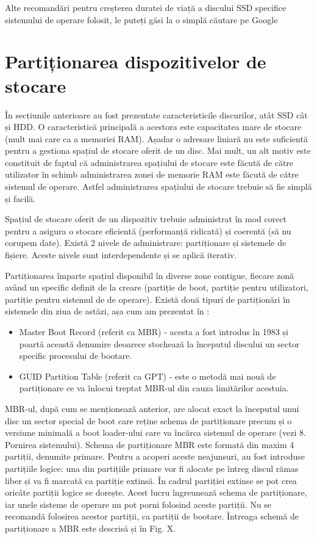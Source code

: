Alte recomandări pentru creșterea duratei de viață a discului SSD specifice
sistemului de operare folosit, le puteți găsi la o simplă căutare pe Google

\section{Partiționarea dispozitivelor de stocare}
\label{sec:storage-part}

În secțiunile anterioare au fost prezentate caracteristicile discurilor, atât
SSD cât și HDD. O caracteristică principală a acestora este capacitatea mare de
stocare (mult mai care ca a memoriei RAM). Așadar o adresare liniară nu este
suficientă pentru a gestiona spațiul de stocare oferit de un disc. Mai mult, un
alt motiv este constituit de faptul că administrarea spațiului de stocare este
făcută de către utilizator în schimb administrarea zonei de memorie RAM este
făcută de către sistemul de operare. Astfel administrarea spațiului de stocare
trebuie să fie simplă și facilă.

Spațiul de stocare oferit de un dispozitiv trebuie administrat în mod corect
pentru a asigura o stocare eficientă (performanță ridicată) și coerentă (să nu
corupem date). Există 2 nivele de administrare: partiționare și sistemele de
fișiere. Aceste nivele sunt interdependente și se aplică iterativ.

Partiționarea împarte spațiul disponibil în diverse zone contigue, fiecare zonă
având un specific definit de la creare (partiție de boot, partiție pentru
utilizatori, partiție pentru sistemul de de operare). Există două tipuri de
partiționări în sistemele din ziua de astăzi, așa cum am prezentat în
:

\begin{itemize}
	\item Master Boot Record (referit ca MBR) - acesta a fost introdus în
		1983 și poartă această denumire deoarece stochează la începutul
		discului un sector specific procesului de bootare.
	\item GUID Partition Table (referit ca GPT) - este o metodă mai nouă de
		partiționare ce va înlocui treptat MBR-ul din cauza limitărilor
		acestuia.
\end{itemize}

MBR-ul, după cum se menționează anterior, are alocat exact la începutul unui
disc un sector special de boot care reține schema de partiționare precum și o
versiune minimală a boot loader-ului care va încărca sistemul de operare (vezi
8. Pornirea sistemului). Schema de partiționare MBR este formată din maxim 4
partiții, denumite primare. Pentru a acoperi aceste neajunsuri, au fost
introduse partițiile logice: una din partițiile primare vor fi alocate pe întreg
discul rămas liber și va fi marcată ca partiție extinsă. În cadrul partiției
extinse se pot crea oricâte partiții logice se dorește. Acest lucru îngreunează
schema de partiționare, iar unele sisteme de operare nu pot porni folosind
aceste partiții. Nu se recomandă folosirea acestor partiții, ca partiții de
bootare. Întreaga schemă de partiționare a MBR este descrisă și în Fig. X.

